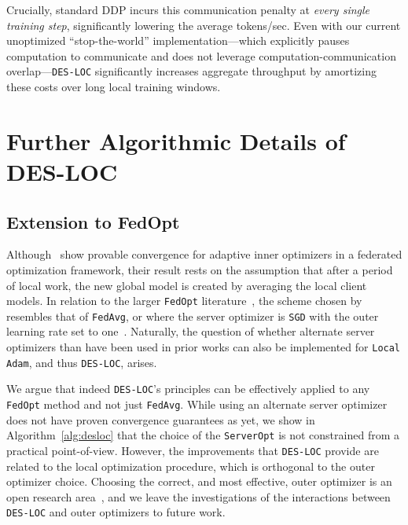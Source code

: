 Crucially, standard DDP incurs this communication penalty at \textit{every single training step}, significantly lowering the average tokens/sec. Even with our current unoptimized ``stop-the-world'' implementation---which explicitly pauses computation to communicate and does not leverage computation-communication overlap---\texttt{DES-LOC} significantly increases aggregate throughput by amortizing these costs over long local training windows.

\begin{center}\end{center}

\section{Further Algorithmic Details of DES-LOC}
\label{sec:appendix_c}

\subsection{Extension to FedOpt}
\label{sec:fedopt}

Although~\citet{cheng2025convergence} show provable convergence for adaptive inner optimizers in a
federated optimization framework, their result rests on the assumption that after a period of local
work, the new global model is created by averaging the local client models. In relation to the larger
\texttt{FedOpt} literature~\citep{reddi2021adaptive}, the scheme chosen by~\citet{cheng2025convergence} resembles
that of \texttt{FedAvg}, or where the server optimizer is \texttt{SGD} with the outer learning rate set to one~\citep{reddi2021adaptive}.
Naturally, the question of whether alternate server optimizers than have been used in prior works
can also be implemented for \texttt{Local Adam}, and thus \texttt{DES-LOC}, arises.

We argue that indeed \texttt{DES-LOC}'s principles can be effectively applied to any \texttt{FedOpt} method and
not just \texttt{FedAvg}. While using an alternate server optimizer does not have proven convergence
guarantees as yet, we show in Algorithm~\ref{alg:desloc} that the choice of the \texttt{ServerOpt} is not constrained
from a practical point-of-view. However, the improvements that \texttt{DES-LOC} provide are related to
the local optimization procedure, which is orthogonal to the outer optimizer choice.
Choosing the correct, and most effective, outer optimizer is an open research area~\citep{khaled2025tuning},
and we leave the investigations of the interactions between \texttt{DES-LOC} and outer optimizers to future work.

